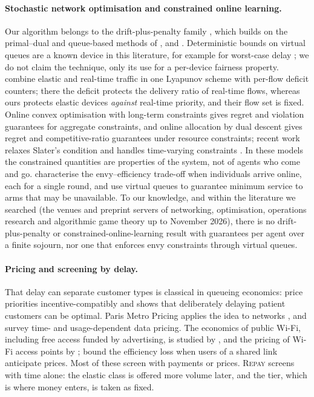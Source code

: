 \documentclass[preprint,11pt]{elsarticle}
\theoremstyle{definition}
\theoremstyle{remark}
\newcommand{\repay}{\textsc{Repay}}
\begin{document}
\paragraph{Stochastic network optimisation and constrained online learning.}
Our algorithm belongs to the drift-plus-penalty family \citep{georgiadis2006resource,neely2010stochastic}, which builds on the primal--dual and queue-based methods of \citet{stolyar2005maximizing}, \citet{eryilmaz2007fair} and \citet{neely2008fairness}.
Deterministic bounds on virtual queues are a known device in this literature, for example for worst-case delay \citep{neely2011worstcase}; we do not claim the technique, only its use for a per-device fairness property.
\citet{jaramillo2011elastic} combine elastic and real-time traffic in one Lyapunov scheme with per-flow deficit counters; there the deficit protects the delivery ratio of real-time flows, whereas ours protects elastic devices \emph{against} real-time priority, and their flow set is fixed.
Online convex optimisation with long-term constraints \citep{mahdavi2012trading,yu2017online,yu2019low} gives regret and violation guarantees for aggregate constraints, and online allocation by dual descent \citep{balseiro2023best,balseiro2025regularized} gives regret and competitive-ratio guarantees under resource constraints; recent work relaxes Slater's condition and handles time-varying constraints \citep{yu2026slater,sarkar2026geometric,abdullah2026dynamic}.
In these models the constrained quantities are properties of the system, not of agents who come and go.
\citet{sinclair2021sequential} characterise the envy--efficiency trade-off when individuals arrive online, each for a single round, and \citet{li2020combinatorial} use virtual queues to guarantee minimum service to arms that may be unavailable.
To our knowledge, and within the literature we searched (the venues and preprint servers of networking, optimisation, operations research and algorithmic game theory up to November 2026), there is no drift-plus-penalty or constrained-online-learning result with guarantees per agent over a finite sojourn, nor one that enforces envy constraints through virtual queues.

\paragraph{Pricing and screening by delay.}
That delay can separate customer types is classical in queueing economics: \citet{mendelson1990optimal} price priorities incentive-compatibly and \citet{afeche2013incentive} shows that deliberately delaying patient customers can be optimal.
Paris Metro Pricing applies the idea to networks \citep{odlyzko1999paris}, and \citet{sen2013survey} survey time- and usage-dependent data pricing.
The economics of public Wi-Fi, including free access funded by advertising, is studied by \citet{yu2017public}, and the pricing of Wi-Fi access points by \citet{musacchio2006wifi}; \citet{johari2004efficiency} bound the efficiency loss when users of a shared link anticipate prices.
Most of these screen with payments or prices.
\repay{} screens with time alone: the elastic class is offered more volume later, and the tier, which is where money enters, is taken as fixed.
\end{document}
